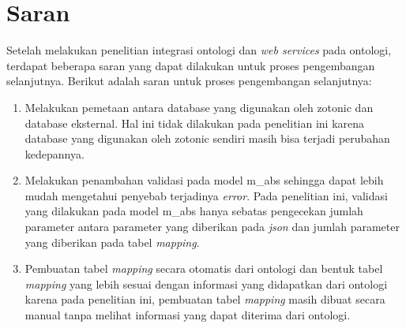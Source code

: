 \section{Saran}
Setelah melakukan penelitian integrasi ontologi dan \textit{web services} pada ontologi, terdapat beberapa saran yang dapat dilakukan untuk proses pengembangan selanjutnya. Berikut adalah saran untuk proses pengembangan selanjutnya:
\begin{enumerate}
	\item Melakukan pemetaan antara database yang digunakan oleh zotonic dan database eksternal. Hal ini tidak dilakukan pada penelitian ini karena database yang digunakan oleh zotonic sendiri masih bisa terjadi perubahan kedepannya.
	\item Melakukan penambahan validasi pada model m\_abs sehingga dapat lebih mudah mengetahui penyebab terjadinya \textit{error}. Pada penelitian ini, validasi yang dilakukan pada model m\_abs hanya sebatas pengecekan jumlah parameter antara parameter yang diberikan pada \textit{json} dan jumlah parameter yang diberikan pada tabel \textit{mapping}.
	\item Pembuatan tabel \textit{mapping} secara otomatis dari ontologi dan bentuk tabel \textit{mapping} yang lebih sesuai dengan informasi yang didapatkan dari ontologi karena pada penelitian ini, pembuatan tabel \textit{mapping} masih dibuat secara manual tanpa melihat informasi yang dapat diterima dari ontologi.
\end{enumerate}